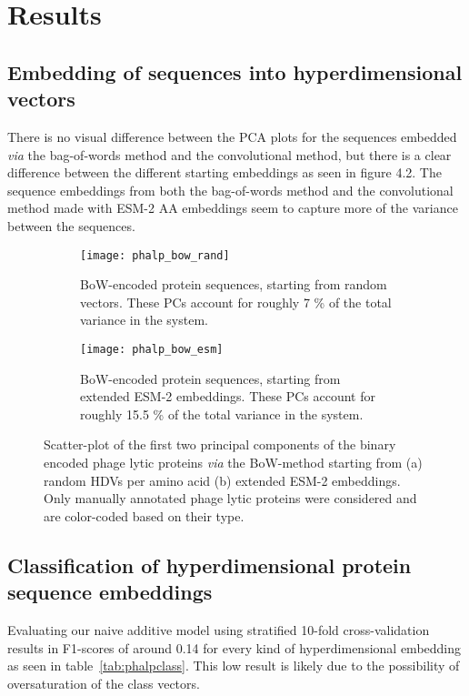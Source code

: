 \section{Results}
\subsection*{Embedding of sequences into hyperdimensional vectors}
There is no visual difference between the PCA plots for the sequences embedded \textit{via} the bag-of-words method and the convolutional method, but there is a clear difference between the different starting embeddings as seen in figure 4.2. The sequence embeddings from both the bag-of-words method and the convolutional method made with ESM-2 AA embeddings seem to capture more of the variance between the sequences.

\begin{figure}[H]
    \centering
    \begin{subfigure}[b]{0.4\textwidth}
        \texttt{[image: phalp\_bow\_rand]}
        \caption{BoW-encoded protein sequences, starting from random vectors. These PCs account for roughly 7 \% of the total variance in the system.}
    \label{fig:phalpbowrand}
    \end{subfigure}
        \hspace{1cm}
    \begin{subfigure}[b]{0.4\textwidth}
        \texttt{[image: phalp\_bow\_esm]}
        \caption{BoW-encoded protein sequences, starting from extended ESM-2 embeddings. These PCs account for roughly 15.5 \% of the total variance in the system.}
    \label{fig:phalpbowesm}
    \end{subfigure}
    \label{fig:phalp_emb}
    \caption{Scatter-plot of the first two principal components of the binary encoded phage lytic proteins \textit{via} the BoW-method starting from (a) random HDVs per amino acid (b) extended ESM-2 embeddings. Only manually annotated phage lytic proteins were considered and are color-coded based on their type.}
\end{figure}
\subsection*{Classification of hyperdimensional protein sequence embeddings}
Evaluating our naive additive model using stratified 10-fold cross-validation results in F1-scores of around 0.14 for every kind of hyperdimensional embedding as seen in table~\ref{tab:phalpclass}. This low result is likely due to the possibility of oversaturation of the class vectors.

